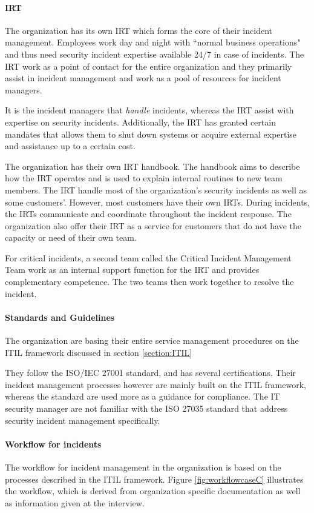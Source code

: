 \paragraph{\acl{IRT}}
The organization has its own \ac{IRT} which forms the core of their incident management. Employees work day and night with ``normal business operations" and thus need security incident expertise available 24/7 in case of incidents. The \ac{IRT} work as a point of contact for the entire organization and they primarily assist in incident management and work as a pool of resources for incident managers. 

It is the incident managers that \emph{handle} incidents, whereas the \ac{IRT} assist with expertise on security incidents. Additionally, the \ac{IRT} has granted certain mandates that allows them to shut down systems or acquire external expertise and assistance up to a certain cost.    

The organization has their own \ac{IRT} handbook. The handbook aims to describe how the \ac{IRT} operates and is used to explain internal routines to new team members. The \ac{IRT} handle most of the organization's security incidents as well as some customers'. However, most customers have their own \acp{IRT}. During incidents, the \acp{IRT} communicate and coordinate throughout the incident response. The organization also offer their \ac{IRT} as a service for customers that do not have the capacity or need of their own team.

For critical incidents, a second team called the Critical Incident Management Team work as an internal support function for the \ac{IRT} and provides complementary competence. The two teams then work together to resolve the incident. 

\paragraph{Standards and Guidelines}
The organization are basing their entire service management procedures on the ITIL framework discussed in section \ref{section:ITIL} 

They follow the ISO/IEC 27001 standard, and has several certifications. Their incident management processes however are mainly built on the ITIL framework, whereas the standard are used more as a guidance for compliance. The IT security manager are not familiar with the ISO 27035 standard that address security incident management specifically. 

\paragraph{Workflow for incidents}
The workflow for incident management in the organization is based on the processes described in the ITIL framework. Figure \ref{fig:workflowcaseC} illustrates the workflow, which is derived from organization specific documentation as well as information given at the interview. 

